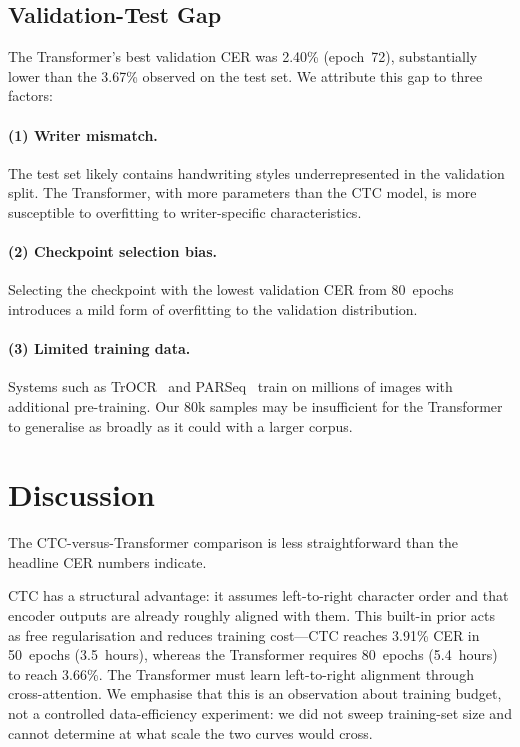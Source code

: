 \documentclass[pdflatex,sn-mathphys-num]{sn-jnl}
\begin{document}
\subsection{Validation-Test Gap}\label{sec:results:gap}

The Transformer's best validation CER was 2.40\% (epoch~72), substantially lower than the 3.67\% observed on the test set. We attribute this gap to three factors:

\paragraph{(1) Writer mismatch.} The test set likely contains handwriting styles underrepresented in the validation split. The Transformer, with more parameters than the CTC model, is more susceptible to overfitting to writer-specific characteristics.

\paragraph{(2) Checkpoint selection bias.} Selecting the checkpoint with the lowest validation CER from 80~epochs introduces a mild form of overfitting to the validation distribution.

\paragraph{(3) Limited training data.} Systems such as TrOCR~\cite{li2023trocr} and PARSeq~\cite{bautista2022parseq} train on millions of images with additional pre-training. Our 80k samples may be insufficient for the Transformer to generalise as broadly as it could with a larger corpus.

\section{Discussion}\label{sec:discussion}

The CTC-versus-Transformer comparison is less straightforward than the headline CER numbers indicate.

CTC has a structural advantage: it assumes left-to-right character order and that encoder outputs are already roughly aligned with them. This built-in prior acts as free regularisation and reduces training cost---CTC reaches 3.91\% CER in 50~epochs (3.5~hours), whereas the Transformer requires 80~epochs (5.4~hours) to reach 3.66\%. The Transformer must learn left-to-right alignment through cross-attention. We emphasise that this is an observation about training budget, not a controlled data-efficiency experiment: we did not sweep training-set size and cannot determine at what scale the two curves would cross.
\end{document}
